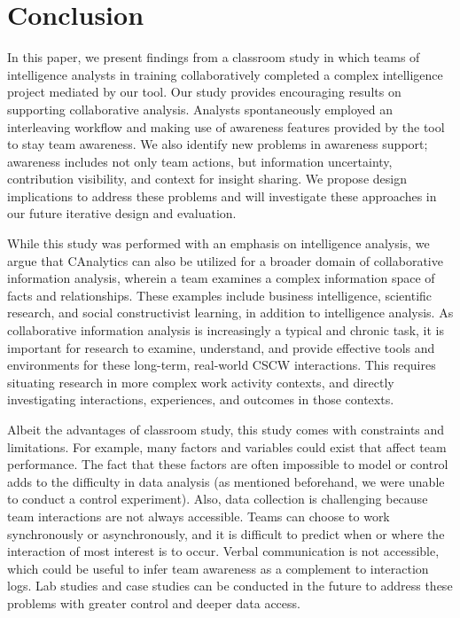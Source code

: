 \section{Conclusion}

In this paper, we present findings from a classroom study in which teams of intelligence analysts in training collaboratively completed a complex intelligence project mediated by our tool. Our study provides encouraging results on supporting collaborative analysis. Analysts spontaneously employed an interleaving workflow and making use of awareness features provided by the tool to stay team awareness. We also identify new problems in awareness support; awareness includes not only team actions, but information uncertainty, contribution visibility, and context for insight sharing. We propose design implications to address these problems and will investigate these approaches in our future iterative design and evaluation.

While this study was performed with an emphasis on intelligence analysis, we argue that CAnalytics can also be utilized for a broader domain of collaborative information analysis, wherein a team examines a complex information space of facts and relationships. These examples include business intelligence, scientific research, and social constructivist learning, in addition to intelligence analysis. As collaborative information analysis is increasingly a typical and chronic task, it is important for research to examine, understand, and provide effective tools and environments for these long-term, real-world CSCW interactions. This requires situating research in more complex work activity contexts, and directly investigating interactions, experiences, and outcomes in those contexts.

Albeit the advantages of classroom study, this study comes with constraints and limitations. For example, many factors and
variables could exist that affect team performance. The fact that these
factors are often impossible to model or control adds to the difficulty
in data analysis (as mentioned beforehand, we were unable to conduct a control experiment). Also, data collection is
challenging because team interactions are not always accessible. Teams
can choose to work synchronously or asynchronously, and it is difficult
to predict when or where the interaction of most interest is to occur.
Verbal communication is not accessible, which could be useful to infer
team awareness as a complement to interaction logs. Lab studies
and case studies can be conducted in the future to address these
problems with greater control and deeper data access.


